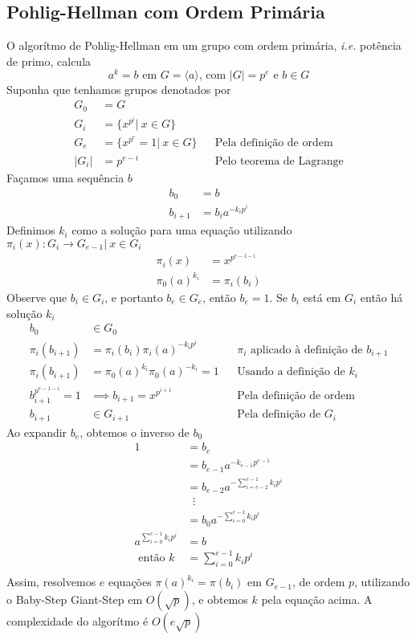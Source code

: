 \documentclass{article}
\begin{document}
\subsection{Pohlig-Hellman com Ordem Primária}
O algorítmo de Pohlig-Hellman em um grupo com ordem primária, \emph{i.e.} potência de primo, calcula
$$ a^k = b \text{ em } G = \langle a \rangle\text{, com }|G| = p^e\text{ e }b \in G$$
Suponha que tenhamos grupos denotados por
\begin{align*}
    G_0 &= G\\
    G_i &= \lbrace x^{p^i} \vert\ x \in G \rbrace\\
    G_e &= \lbrace x^{p^e} = 1 \vert\ x \in G \rbrace   &&\text{Pela definição de ordem}\\
  |G_i| &= p^{e-i}                                      &&\text{Pelo teorema de Lagrange}
\end{align*}
Façamos uma sequência $b$
\begin{align*}
    b_0 &= b\\
    b_{i+1} &= b_i a^{-k_i p^{i}}
\end{align*}
Definimos $k_i$ como a solução para uma equação utilizando $\pi_i(x) : G_i \rightarrow G_{e-1} |\ x \in G_i$
\begin{align*}
    \pi_i(x) &= x^{p^{e-1-i}}\\
    \pi_0(a)^{k_i} &= \pi_i(b_i)
\end{align*}
Observe que $b_i \in G_i$, e portanto $b_e \in G_e$, então $b_e = 1$. Se $b_i$ está em $G_i$ então há solução $k_i$
\begin{align*}
    b_0 &\in G_0\\
    \pi_i(b_{i+1}) &= \pi_i(b_i)\pi_i(a)^{-k_ip^i}          &&\text{$\pi_i$ aplicado à definição de $b_{i+1}$}\\
    \pi_i(b_{i+1}) &= \pi_0(a)^{k_i}\pi_0(a)^{-k_i} = 1     &&\text{Usando a definição de $k_i$}\\
    b_{i+1}^{p^{e-1-i}} = 1 &\implies b_{i+1} = x^{p^{i+1}} &&\text{Pela definição de ordem}\\
    b_{i+1} &\in G_{i+1}                                    &&\text{Pela definição de $G_i$}
\end{align*}
Ao expandir $b_e$, obtemos o inverso de $b_0$
\begin{align*}
    1 &= b_e\\
    &= b_{e-1}a^{-k_{e-1} p^{e-1}}\\
    &= b_{e-2}a^{-\sum_{i=e-2}^{e-1}{k_i p^i}}\\
    &\;\;\vdots\\
    &= b_{0}a^{-\sum_{i=0}^{e-1}{k_i p^i}}\\
    a^{\sum_{i=0}^{e-1}{k_i p^i}} &= b\\
  \text{ então } k &= \sum_{i=0}^{e-1}{k_i p^i}\\
\end{align*}
Assim, resolvemos $e$ equações $\pi(a)^{k_i} = \pi(b_i)$ em $G_{e-1}$, de ordem $p$, utilizando o Baby-Step Giant-Step em $O(\sqrt{p})$, e obtemos $k$ pela equação acima. A complexidade do algorítmo é $O(e\sqrt{p})$
\end{document}
